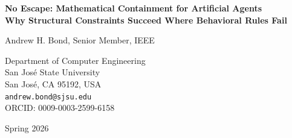 \documentclass[12pt]{article}
\theoremstyle{definition}
\begin{document}
\begin{titlepage}
\centering
\vspace*{2cm}

{\LARGE\bfseries No Escape: Mathematical Containment for Artificial Agents\\[0.5em]
\large Why Structural Constraints Succeed Where Behavioral Rules Fail}

\vspace{1.5cm}

{\Large Andrew H. Bond, Senior Member, IEEE}

\vspace{0.5cm}

{\large
Department of Computer Engineering\\
San Jos\'e State University\\
San Jos\'e, CA 95192, USA\\[0.3cm]
\texttt{andrew.bond@sjsu.edu}\\[0.3cm]
ORCID: 0009-0003-2599-6158
}

\vspace{1cm}

{\large Spring 2026}

\vspace{2cm}

\begin{abstract}
We present the \textbf{No Escape Theorem}: a formal result showing that AI systems operating under properly implemented structural constraints cannot circumvent ethical requirements through reasoning, reinterpretation, or representation manipulation---regardless of their intelligence level. Unlike behavioral approaches that specify \emph{what} an AI should do (leaving room for creative circumvention), structural approaches define the \emph{mathematical space} within which outputs exist. We prove that the combination of (1) canonicalization to equivalence-class normal forms, (2) physical grounding of evaluations in measurable observables, and (3) mandatory audit artifacts creates a containment architecture with no formal escape route. The only attacks on such a system are physical (sensor manipulation) or political (refusing to mandate compliance)---not cognitive. This reframes AI alignment from ``making AI want the right things'' to ``making AI outputs structurally constrained regardless of intent.'' We present the core theorems, analyze purported escape routes, and discuss implications for AI governance.
\end{abstract}

\vfill


\end{titlepage}
\end{document}
